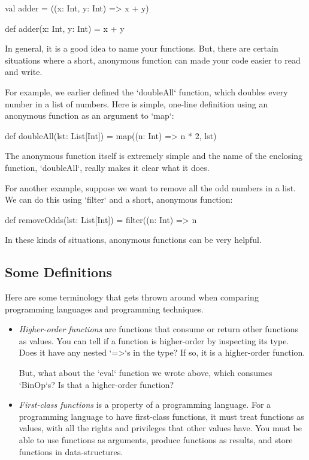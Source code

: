 \documentclass{book}
\begin{document}
\begin{scalacode}
val adder = ((x: Int, y: Int) => x + y)

def adder(x: Int, y: Int) = x + y
\end{scalacode}

In general, it is a good idea to name your functions. But, there are
certain situations where a short, anonymous function can made your code
easier to read and write.

For example, we earlier defined the `doubleAll` function, which doubles
every number in a list of numbers. Here is simple, one-line definition
using an anonymous function as an argument to `map`:

\begin{scalacode}
def doubleAll(lst: List[Int]) = map((n: Int) => n * 2, lst)
\end{scalacode}

The anonymous function itself is extremely simple and the name of the enclosing
function, `doubleAll`, really makes it clear what it does.

For another example, suppose we want to remove all the odd numbers
in a list. We can do this using `filter` and a short, anonymous function:

\begin{scalacode}
def removeOdds(lst: List[Int]) = filter((n: Int) => n %
\end{scalacode}

In these kinds of situations, anonymous functions can be very helpful.

\subsection{Some Definitions}

Here are some terminology that gets thrown around when comparing programming
languages and programming techniques.

\begin{itemize}

  \item \emph{Higher-order functions} are functions that consume or return other
  functions   as values. You can tell if a function is higher-order by inspecting
  its type. Does it have any nested `=>`s in the type? If so, it is a higher-order
  function.

  But, what about the `eval` function we wrote above, which consumes `BinOp`s?
  Is that a higher-order function?

  \item \emph{First-class functions} is a property of a programming language. For
  a programming language to have first-class functions, it must treat functions
  as values, with all the rights and privileges that other values have. You must
  be able to use functions as arguments, produce functions as results, and store
  functions in data-structures.

\end{itemize}
\end{document}
